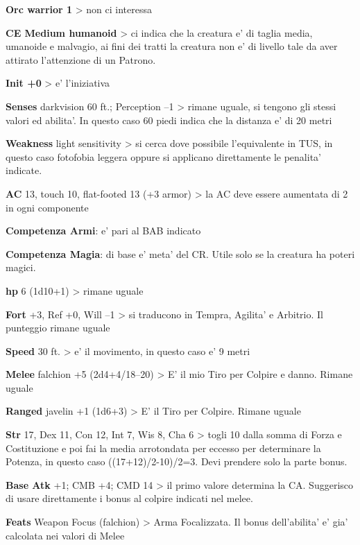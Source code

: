 \documentclass[a4paper,11pt,twoside,openany]{book}
\begin{document}
{		\textbf{Orc warrior 1} \textgreater{} non ci interessa
		
		\textbf{CE Medium humanoid} \textgreater{} ci indica che la creatura e' di taglia media, umanoide e malvagio, ai fini dei tratti la creatura non e' di livello tale da aver attirato l'attenzione di un Patrono.
		
		\textbf{Init +0} \textgreater{} e' l'iniziativa
		
		\textbf{Senses} darkvision 60 ft.; Perception --1 \textgreater{} rimane uguale, si tengono gli stessi valori ed abilita'. In questo caso 60 piedi indica che la distanza e' di 20 metri
		
		\textbf{Weakness} light sensitivity \textgreater{} si cerca dove possibile l'equivalente in TUS, in questo caso fotofobia leggera oppure si applicano direttamente le penalita' indicate.
		
		\textbf{AC} 13, touch 10, flat-footed 13 (+3 armor) \textgreater{} la AC deve essere aumentata di 2 in ogni componente
		
		\textbf{Competenza Armi}: e' pari al BAB indicato
		
		\textbf{Competenza Magia}: di base e' meta' del CR. Utile solo se la creatura ha poteri magici.
		
		\textbf{hp} 6 (1d10+1) \textgreater{} rimane uguale
		
		\textbf{Fort} +3, Ref +0, Will --1 \textgreater{} si traducono in Tempra, Agilita' e Arbitrio. Il punteggio rimane uguale
		
		\textbf{Speed} 30 ft. \textgreater{} e' il movimento, in questo
		caso e' 9 metri
		
		\textbf{Melee} falchion +5 (2d4+4/18--20) \textgreater{} E' il mio Tiro per Colpire e danno. Rimane uguale
		
		\textbf{Ranged} javelin +1 (1d6+3) \textgreater{} E' il Tiro per Colpire. Rimane uguale
		
		\textbf{Str} 17, Dex 11, Con 12, Int 7, Wis 8, Cha 6 \textgreater{} togli 10 dalla somma di Forza e Costituzione e poi fai la media arrotondata per eccesso per determinare la Potenza, in questo caso ((17+12)/2-10)/2=3. Devi prendere solo la parte bonus.
		
		\textbf{Base Atk} +1; CMB +4; CMD 14 \textgreater{} il primo valore determina la CA. Suggerisco di usare direttamente i bonus al colpire indicati nel melee. 
		
		\textbf{Feats} Weapon Focus (falchion) \textgreater{} Arma Focalizzata. Il bonus dell'abilita' e' gia' calcolata nei valori di Melee
		
}
\end{document}
